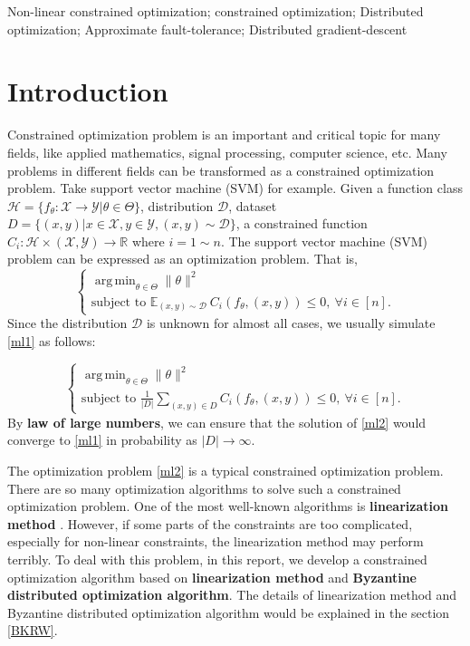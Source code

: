 \documentclass[conference]{IEEEtran}
\DeclareMathOperator*{\argmin}{arg\,min}
\begin{document}
\begin{IEEEkeywords}
Non-linear constrained optimization; constrained optimization; Distributed optimization; Approximate fault-tolerance; Distributed gradient-descent
\end{IEEEkeywords}

\section{Introduction}
Constrained optimization problem is an important and critical topic for many fields, like applied mathematics, signal processing, computer science, etc. Many problems in different fields can be transformed as a constrained optimization problem. Take support vector machine (SVM) for example. Given a function class $\mathcal{H}= \{f_{\theta}: \mathcal{X} \rightarrow \mathcal{Y} | \theta \in \Theta \}$, distribution $\mathcal{D}$, dataset $D=\{(x, y)| x\in\mathcal{X}, y\in\mathcal{Y}, (x, y)\sim \mathcal{D}\}$, a constrained function $C_i: \mathcal{H} \times (\mathcal{X}, \mathcal{Y}) \rightarrow \mathbb{R}$ where $i=1\sim n$. The support vector machine (SVM) problem can be expressed as an optimization problem. That is, 
\begin{equation*}
\tag{SVM}
\begin{cases}
    \argmin_{\theta\in\Theta} \|\theta\|^2 \\
    \text{subject to }
    \mathbb{E}_{(x, y) \sim \mathcal{D}} ~C_i(f_{\theta}, (x, y)) \leq 0, ~\forall{i\in[n]}.
\end{cases}
\label{ml1}
\end{equation*}
Since the distribution $\mathcal{D}$ is unknown for almost all cases, we usually simulate \eqref{ml1} as follows:

\begin{equation*}
\tag{SVM*}
\begin{cases}
    \argmin_{\theta\in\Theta} \|\theta\|^2 \\
    \text{subject to }
    \frac{1}{|D|}\sum_{(x, y) \in D} C_i(f_{\theta}, (x, y)) \leq 0, ~\forall{i\in[n]}.
\end{cases}
\label{ml2}
\end{equation*}
By \textbf{law of large numbers}, we can ensure that the solution of \eqref{ml2} would converge to \eqref{ml1} in probability as $|D|\rightarrow \infty$. 

The optimization problem \eqref{ml2} is a typical constrained optimization problem. There are so many optimization algorithms to solve such a constrained optimization problem. One of the most well-known algorithms is \textbf{linearization method} \cite{wilson2012linearization}. 
However, if some parts of the constraints are too complicated, especially for non-linear constraints, the linearization method may perform terribly. To deal with this problem, in this report, we develop a constrained optimization algorithm based on \textbf{linearization method} and \textbf{Byzantine distributed optimization algorithm}. The details of linearization method and Byzantine distributed optimization algorithm would be explained in the section \ref{BKRW}.
\end{document}
